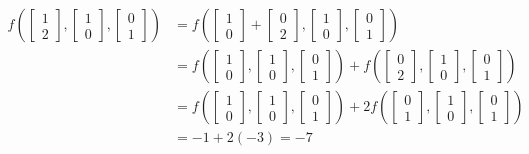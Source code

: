 \documentclass{report}
\begin{document}
$$
\begin{aligned}
f\left(\begin{bmatrix} 1 \\ 2 \end{bmatrix}, \begin{bmatrix} 1 \\ 0 \end{bmatrix}, \begin{bmatrix} 0 \\ 1 \end{bmatrix} \right) & =
f\left(\begin{bmatrix} 1 \\ 0 \end{bmatrix} + \begin{bmatrix} 0 \\ 2 \end{bmatrix}, \begin{bmatrix} 1 \\ 0 \end{bmatrix}, \begin{bmatrix} 0 \\ 1 \end{bmatrix} \right) \\
& = f\left(\begin{bmatrix} 1 \\ 0 \end{bmatrix}, \begin{bmatrix} 1 \\ 0 \end{bmatrix}, \begin{bmatrix} 0 \\ 1 \end{bmatrix} \right) +
f\left(\begin{bmatrix} 0 \\ 2 \end{bmatrix}, \begin{bmatrix} 1 \\ 0 \end{bmatrix}, \begin{bmatrix} 0 \\ 1 \end{bmatrix} \right) \\
& = f\left(\begin{bmatrix} 1 \\ 0 \end{bmatrix}, \begin{bmatrix} 1 \\ 0 \end{bmatrix}, \begin{bmatrix} 0 \\ 1 \end{bmatrix} \right) +
2f\left(\begin{bmatrix} 0 \\ 1 \end{bmatrix}, \begin{bmatrix} 1 \\ 0 \end{bmatrix}, \begin{bmatrix} 0 \\ 1 \end{bmatrix} \right) \\
& = -1 + 2(-3) = -7
\end{aligned}
$$
\end{document}

